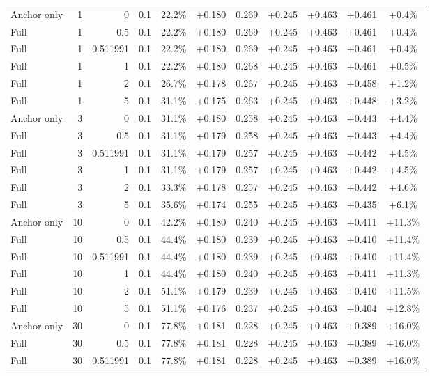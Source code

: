 \begin{table}[htbp]
\begin{tabular}{lrrrccccccc}
Anchor only & 1 & 0 & 0.1 & 22.2\% & +0.180 & 0.269 & +0.245 & +0.463 & +0.461 & +0.4\% \\
Full & 1 & 0.5 & 0.1 & 22.2\% & +0.180 & 0.269 & +0.245 & +0.463 & +0.461 & +0.4\% \\
Full & 1 & 0.511991 & 0.1 & 22.2\% & +0.180 & 0.269 & +0.245 & +0.463 & +0.461 & +0.4\% \\
Full & 1 & 1 & 0.1 & 22.2\% & +0.180 & 0.268 & +0.245 & +0.463 & +0.461 & +0.5\% \\
Full & 1 & 2 & 0.1 & 26.7\% & +0.178 & 0.267 & +0.245 & +0.463 & +0.458 & +1.2\% \\
Full & 1 & 5 & 0.1 & 31.1\% & +0.175 & 0.263 & +0.245 & +0.463 & +0.448 & +3.2\% \\
Anchor only & 3 & 0 & 0.1 & 31.1\% & +0.180 & 0.258 & +0.245 & +0.463 & +0.443 & +4.4\% \\
Full & 3 & 0.5 & 0.1 & 31.1\% & +0.179 & 0.258 & +0.245 & +0.463 & +0.443 & +4.4\% \\
Full & 3 & 0.511991 & 0.1 & 31.1\% & +0.179 & 0.257 & +0.245 & +0.463 & +0.442 & +4.5\% \\
Full & 3 & 1 & 0.1 & 31.1\% & +0.179 & 0.257 & +0.245 & +0.463 & +0.442 & +4.5\% \\
Full & 3 & 2 & 0.1 & 33.3\% & +0.178 & 0.257 & +0.245 & +0.463 & +0.442 & +4.6\% \\
Full & 3 & 5 & 0.1 & 35.6\% & +0.174 & 0.255 & +0.245 & +0.463 & +0.435 & +6.1\% \\
Anchor only & 10 & 0 & 0.1 & 42.2\% & +0.180 & 0.240 & +0.245 & +0.463 & +0.411 & +11.3\% \\
Full & 10 & 0.5 & 0.1 & 44.4\% & +0.180 & 0.239 & +0.245 & +0.463 & +0.410 & +11.4\% \\
Full & 10 & 0.511991 & 0.1 & 44.4\% & +0.180 & 0.239 & +0.245 & +0.463 & +0.410 & +11.4\% \\
Full & 10 & 1 & 0.1 & 44.4\% & +0.180 & 0.240 & +0.245 & +0.463 & +0.411 & +11.3\% \\
Full & 10 & 2 & 0.1 & 51.1\% & +0.179 & 0.239 & +0.245 & +0.463 & +0.410 & +11.5\% \\
Full & 10 & 5 & 0.1 & 51.1\% & +0.176 & 0.237 & +0.245 & +0.463 & +0.404 & +12.8\% \\
Anchor only & 30 & 0 & 0.1 & 77.8\% & +0.181 & 0.228 & +0.245 & +0.463 & +0.389 & +16.0\% \\
Full & 30 & 0.5 & 0.1 & 77.8\% & +0.181 & 0.228 & +0.245 & +0.463 & +0.389 & +16.0\% \\
Full & 30 & 0.511991 & 0.1 & 77.8\% & +0.181 & 0.228 & +0.245 & +0.463 & +0.389 & +16.0\% \\

\end{tabular}
\end{table}
